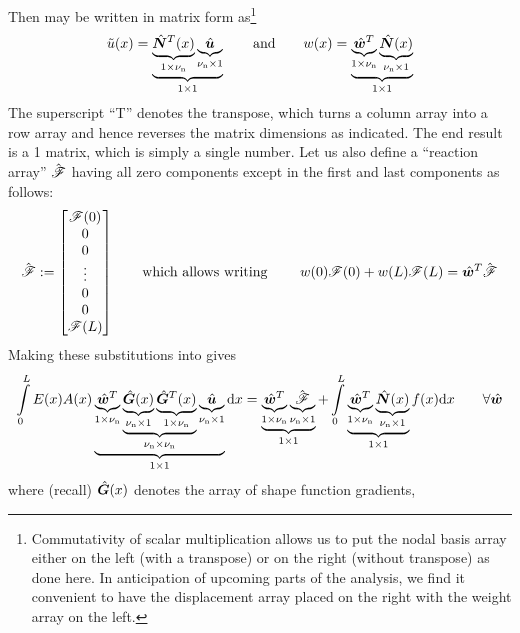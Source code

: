 Then  may be written in matrix form as\footnote{Commutativity of scalar multiplication allows us to put the nodal basis array either on the left (with a transpose) or on the right (without transpose) as done here. In anticipation of upcoming parts of the analysis, we find it convenient to have the displacement array placed on the right with the weight array on the left.}
\begin{equation}
  \tilde{u}(x)=\underbrace{
\underbrace{\hat{\bm{N}}^T(x)}_{1\times{\nu_\text{n}}} \underbrace{\hat{\bm{u}}}_{{\nu_\text{n}}\times1}}_{1\times1}
\qquad\text{and}\qquad
  w(x)=\underbrace{\underbrace{\hat{\bm{w}}^T}_{1\times{\nu_\text{n}}}\underbrace{\hat{\bm{N}}(x)}_{{\nu_\text{n}}\times1}}_{1\times1}
\end{equation}
The superscript ``T'' denotes the transpose, which turns a column array into a row array and hence reverses the matrix dimensions as indicated.  The end result is a 1 matrix, which is simply a single number.  Let us also define a ``reaction array'' $\hat{\bm{\mathscr{F}}}$ having all zero components except in the first and last components as follows:
\begin{equation}
  \hat{\bm{\mathscr{F}}}:=
\begin{bmatrix}
\mathscr{F}(0) \\
0 \\
0 \\
\vdots\\
0 \\
0 \\
\mathscr{F}(L)
\end{bmatrix}
\qquad\text{which allows writing }\qquad
w(0)\mathscr{F}(0)+w(L)\mathscr{F}(L)=\hat{\bm{w}}^T\hat{\bm{\mathscr{F}}}
\end{equation}
Making these substitutions into  gives
\begin{equation}
 \int\limits_0^L E(x)A(x) 
\underbrace{
	\underbrace{
           \hat{\bm{w}}^T
   }_{1\times{\nu_\text{n}}}
	\underbrace{
	      \underbrace{
              \hat{\bm{G}}(x)
          }_{{\nu_\text{n}}\times1}
	     \underbrace{
            \hat{\bm{G}}^T(x)
          }_{1\times{\nu_\text{n}}}
	}_{{\nu_\text{n}}\times{\nu_\text{n}}}
	\underbrace{\hat{\bm{u}}}_{{\nu_\text{n}}\times1}
}_{1\times1} 
\mathrm{d} x 
= 
\underbrace{\underbrace{\hat{\bm{w}}^T}_{1\times{\nu_\text{n}}}\underbrace{\hat{\bm{\mathscr{F}}}}_{{\nu_\text{n}}\times1}}_{1\times1}
+  \int\limits_0^L \underbrace{\underbrace{\hat{\bm{w}}^T}_{1\times{\nu_\text{n}}}\underbrace{\hat{\bm{N}}(x)}_{{\nu_\text{n}}\times1}}_{1\times1}f(x)
\mathrm{d} x
 \qquad\forall\hat{\bm{w}}
\label{eq:LinearBarWeakFormWithForces}
\end{equation}
where (recall) $\hat{\bm{G}}(x)$ denotes the array of shape function gradients,

